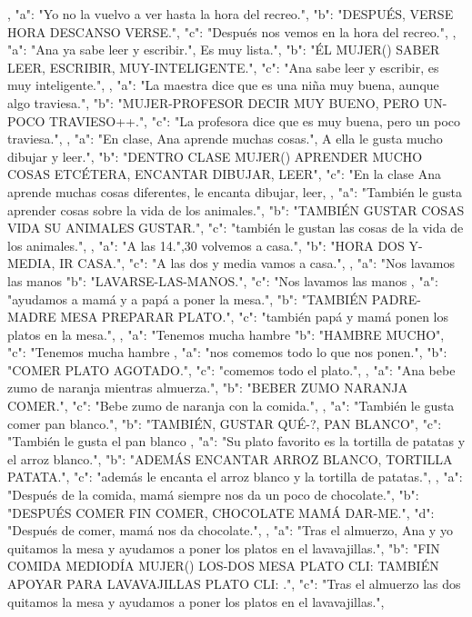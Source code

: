 ,
{
"a": "Yo no la vuelvo a ver hasta la hora del recreo.",
"b": "DESPUÉS, VERSE HORA DESCANSO VERSE.",
"c": "Después nos vemos en la hora del recreo.",
}
,
{
"a": "Ana ya sabe leer y escribir.", Es muy lista.",
"b": "ÉL MUJER() SABER LEER, ESCRIBIR, MUY-INTELIGENTE.",
"c": "Ana sabe leer y escribir, es muy inteligente.",
}
,
{
"a": "La maestra dice que es una niña muy buena, aunque algo traviesa.",
"b": "MUJER-PROFESOR DECIR MUY BUENO, PERO UN-POCO TRAVIESO++.",
"c": "La profesora dice que es muy buena, pero un poco traviesa.",
}
,
{
"a": "En clase, Ana aprende muchas cosas.", A ella le gusta mucho dibujar y leer.",
"b": "DENTRO CLASE MUJER() APRENDER MUCHO COSAS ETCÉTERA, ENCANTAR DIBUJAR, LEER",
"c": "En la clase Ana aprende muchas cosas diferentes, le encanta dibujar, leer,
}
,
{
"a": "También le gusta aprender cosas sobre la vida de los animales.",
"b": "TAMBIÉN GUSTAR COSAS VIDA SU ANIMALES GUSTAR.",
"c": "también le gustan las cosas de la vida de los animales.",
}
,
{
"a": "A las 14.",30 volvemos a casa.",
"b": "HORA DOS Y-MEDIA, IR CASA.",
"c": "A las dos y media vamos a casa.",
}
,
{
"a": "Nos lavamos las manos
"b": "LAVARSE-LAS-MANOS.",
"c": "Nos lavamos las manos 
}
,
{
"a": "ayudamos a mamá y a papá a poner la mesa.",
"b": "TAMBIÉN PADRE-MADRE MESA PREPARAR PLATO.",
"c": "también papá y mamá ponen los platos en la mesa.",
}
,
{
"a": "Tenemos mucha hambre 
"b": "HAMBRE MUCHO",
"c": "Tenemos mucha hambre 
}
,
{
"a": "nos comemos todo lo que nos ponen.",
"b": "COMER PLATO AGOTADO.",
"c": "comemos todo el plato.",
}
,
{
"a": "Ana bebe zumo de naranja mientras almuerza.",
"b": "BEBER ZUMO NARANJA COMER.",
"c": "Bebe zumo de naranja con la comida.",
}
,
{
"a": "También le gusta comer pan blanco.",
"b": "TAMBIÉN, GUSTAR QUÉ-?, PAN BLANCO",
"c": "También le gusta el pan blanco
}
,
{
"a": "Su plato favorito es la tortilla de patatas y el arroz blanco.",
"b": "ADEMÁS ENCANTAR ARROZ BLANCO, TORTILLA PATATA.",
"c": "además le encanta el arroz blanco y la tortilla de patatas.",
}
,
{
"a": "Después de la comida, mamá siempre nos da un poco de chocolate.",
"b": "DESPUÉS COMER FIN COMER, CHOCOLATE MAMÁ DAR-ME.",
"d": "Después de comer, mamá nos da chocolate.",
}
,
{
"a": "Tras el almuerzo, Ana y yo quitamos la mesa y ayudamos a poner los platos en el lavavajillas.",
"b": "FIN COMIDA MEDIODÍA MUJER() LOS-DOS MESA PLATO CLI:  TAMBIÉN APOYAR PARA LAVAVAJILLAS PLATO CLI: .",
"c": "Tras el almuerzo las dos quitamos la mesa y ayudamos a poner los platos en el lavavajillas.",
 }

